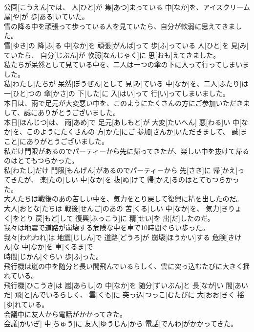 \documentclass[8pt]{extreport}
\begin{document}
\begin{CJK}{UTF8}{min}
\\	公園[こうえん]では、 人[ひと]が 集[あつ]まっている 中[なか]を、アイスクリーム 屋[や]が 歩[ある]いていた。
\\	雪の降る中を頑張って歩っている人を見ていたら、自分が軟弱に思えてきました。	
\\	雪[ゆき]の 降[ふ]る 中[なか]を 頑張[がんば]って 歩[ふ]っている 人[ひと]を 見[み]ていたら、 自分[じぶん]が 軟弱[なんじゃく]に 思[おも]えてきました。
\\	私たちが呆然として見ている中を、二人は一つの傘の下に入って行ってしまいました。	
\\	私[わたし]たちが 呆然[ぼうぜん]として 見[み]ている 中[なか]を、二人[ふたり]は 一[ひと]つの 傘[かさ]の 下[した]に 入[はい]って 行[い]ってしまいました。
\\	本日は、雨で足元が大変悪い中を、このようにたくさんの方にご参加いただきまして、誠にありがとうございました。	
\\	本日[ほんじつ]は、 雨[あめ]で 足元[あしもと]が 大変[たいへん] 悪[わる]い 中[なか]を、このようにたくさんの 方[かた]にご 参加[さんか]いただきまして、 誠[まこと]にありがとうございました。
\\	私だけ門限があるのでパーティーから先に帰ってきたが、楽しい中を抜けて帰るのはとてもつらかった。	
\\	私[わたし]だけ 門限[もんげん]があるのでパーティーから 先[さき]に 帰[かえ]ってきたが、 楽[たの]しい 中[なか]を 抜[ぬ]けて 帰[かえ]るのはとてもつらかった。
\\	大人たちは戦後のあの苦しい中を、気力をとり戻して復興に精を出したのだ。	
\\	大人[おとな]たちは 戦後[せんご]のあの 苦[くる]しい 中[なか]を、 気力[きりょく]をとり 戻[もど]して 復興[ふっこう]に 精[せい]を 出[だ]したのだ。
\\	我々は地震で道路が崩壊する危険な中を車で10時間ぐらい歩った。	
\\	我々[われわれ]は 地震[じしん]で 道路[どうろ]が 崩壊[ほうかい]する 危険[きけん]な 中[なか]を 車[くるま]で 
\\	時間[じかん]ぐらい 歩[ふ]った。
\\	飛行機は嵐の中を随分と長い間飛んでいるらしく、雲に突っ込むたびに大きく揺れている。	
\\	飛行機[ひこうき]は 嵐[あらし]の 中[なか]を 随分[ずいぶん]と 長[なが]い 間[あいだ] 飛[と]んでいるらしく、 雲[くも]に 突っ込[つっこ]むたびに 大[おお]きく 揺[ゆ]れている。
\\	会議中に友人から電話がかかってきた。	
\\	会議[かいぎ] 中[ちゅう]に 友人[ゆうじん]から 電話[でんわ]がかかってきた。

\end{CJK}
\end{document}
